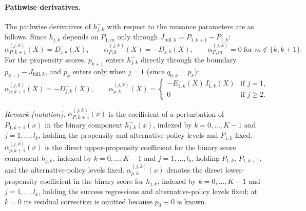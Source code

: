 \paragraph{Pathwise derivatives.} The pathwise derivatives of $h_{j,k}^{-}$ with respect to the nuisance parameters are as follows. Since $h_{j,k}^{-}$ depends on $P_{1,m}$ only through $J_{\text{full},k} = P_{1,k+1} - P_{1,k}$:
\begin{equation*}
    \alpha_{P,k+1}^{(j,k)}(X) = D_{j,k}^{-}(X), \qquad \alpha_{P,k}^{(j,k)}(X) = -D_{j,k}^{-}(X), \qquad \alpha_{P,m}^{(j,k)} = 0 \;\text{for } m \notin \{k, k{+}1\}.
\end{equation*}
For the propensity scores, $p_{k+1}$ enters $h_{j,k}^{-}$ directly through the boundary $p_{k+1} - J_{\text{full},k}$, and $p_k$ enters only when $j = 1$ (since $q_{0,k} = p_k$):
\begin{equation*}
    \alpha_{p,k+1}^{(j,k)}(X) = -D_{j,k}^{-}(X), \qquad
    \alpha_{p,k}^{(j,k)}(X) = \begin{cases} -E_{1,k}^{-}(X)\, I_{1,k}^{-}(X) & \text{if } j = 1, \\ 0 & \text{if } j \geqslant 2. \end{cases}
\end{equation*}

\noindent\textit{Remark (notation).} $\alpha_{P,k+1}^{(j,k)}(x)$ is the coefficient of a perturbation of $P_{1,k+1}(x)$ in the binary component $h_{j,k}^{-}(x)$, indexed by $k=0,\ldots,K-1$ and $j=1,\ldots,l_k$, holding the propensity and alternative-policy levels and $P_{1,k}$ fixed. $\alpha_{p,k+1}^{(j,k)}(x)$ is the direct upper-propensity coefficient for the binary score component $h_{j,k}^{-}$, indexed by $k=0,\ldots,K-1$ and $j=1,\ldots,l_k$, holding $P_{1,k}$, $P_{1,k+1}$, and the alternative-policy levels fixed. $\alpha_{p,k}^{(j,k)}(x)$ denotes the direct lower-propensity coefficient in the binary score for $h_{j,k}^{-}$, indexed by $k=0,\ldots,K-1$ and $j=1,\ldots,l_k$, holding the success regressions and alternative-policy levels fixed; at $k=0$ its residual correction is omitted because $p_0\equiv0$ is known.


